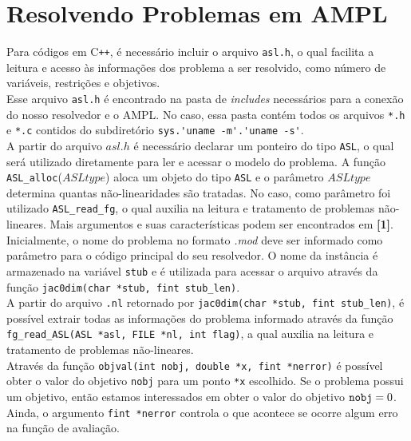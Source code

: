 \documentclass{article}
\begin{document}
\section{Resolvendo Problemas em AMPL}
Para códigos em C\verb|++|, é necessário incluir o arquivo \verb|asl.h|, o qual facilita a leitura e acesso às informações dos problema a ser resolvido, como número de variáveis, restrições e objetivos.\\

Esse arquivo \verb|asl.h| é encontrado na pasta de \textit{includes} necessários para a conexão do nosso resolvedor e o AMPL. No caso, essa pasta contém todos os arquivos \verb|*.h| e \verb|*.c| contidos do subdiretório \verb|sys.'uname -m'.'uname -s'|. \\

A partir do arquivo $asl.h$ é necessário declarar um ponteiro do tipo \verb|ASL|, o qual será utilizado diretamente para ler e acessar o modelo do problema. 
A função \verb|ASL_alloc|($ASLtype$) aloca um objeto do tipo \verb|ASL| e o parâmetro $ASLtype$ determina quantas não-linearidades são tratadas. No caso, como parâmetro foi utilizado \verb|ASL_read_fg|, o qual auxilia na leitura e tratamento de problemas não-lineares. Mais argumentos e suas características podem ser encontrados em \textbf{[1]}. \\

Inicialmente, o nome do problema no formato \textit{.mod} deve ser informado como parâmetro para o código principal do seu resolvedor. O nome da instância é armazenado na variável \verb|stub| e é utilizada para acessar o arquivo através da função \verb|jac0dim(char *stub, fint stub_len)|. \\ 

A partir do arquivo \verb|.nl| retornado por \verb|jac0dim(char *stub, fint stub_len)|, é possível extrair todas as informações do problema informado através da função \verb|fg_read_ASL(ASL *asl, FILE *nl, int flag)|, a qual auxilia na leitura e tratamento de problemas não-lineares.\\  

Através da função \verb|objval(int nobj, double *x, fint *nerror)| é possível obter o valor do objetivo \verb|nobj| para um ponto \verb|*x| escolhido. Se o problema possui um objetivo, então estamos interessados em obter o valor do objetivo $\verb|nobj| = 0$. Ainda, o argumento \verb|fint *nerror| controla o que acontece se ocorre algum erro na função de avaliação. \\
\end{document}
